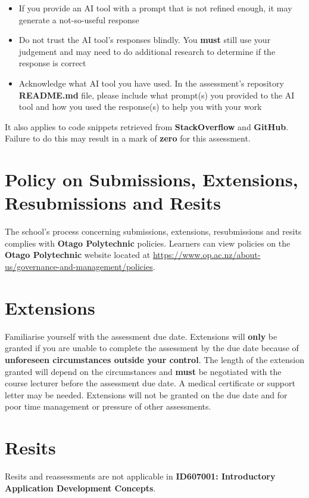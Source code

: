 \documentclass{article}
\begin{document}
\begin{itemize}
    \item If you provide an AI tool with a prompt that is not refined enough, it may generate a not-so-useful response
    \item Do not trust the AI tool's responses blindly. You \textbf{must} still use your judgement and may need to do additional research to determine if the response is correct
    \item Acknowledge what AI tool you have used. In the assessment's repository \textbf{README.md} file, please include what prompt(s) you provided to the AI tool and how you used the response(s) to help you with your work
\end{itemize}

It also applies to code snippets retrieved from \textbf{StackOverflow} and \textbf{GitHub}. \\
 
Failure to do this may result in a mark of \textbf{zero} for this assessment.

\section*{Policy on Submissions, Extensions, Resubmissions and Resits}
The school's process concerning submissions, extensions, resubmissions and resits complies with \textbf{Otago Polytechnic} policies. Learners can view policies on the \textbf{Otago Polytechnic} website located at \href{https://www.op.ac.nz/about-us/governance-and-management/policies}{https://www.op.ac.nz/about-us/governance-and-management/policies}. 

\section*{Extensions}
Familiarise yourself with the assessment due date. Extensions will \textbf{only} be granted if you are unable to complete the assessment by the due date because of \textbf{unforeseen circumstances outside your control}. The length of the extension granted will depend on the circumstances and \textbf{must} be negotiated with the course lecturer before the assessment due date. A medical certificate or support letter may be needed. Extensions will not be granted on the due date and for poor time management or pressure of other assessments.

\section*{Resits}
Resits and reassessments are not applicable in \textbf{ID607001: Introductory Application Development Concepts}. 
\end{document}
